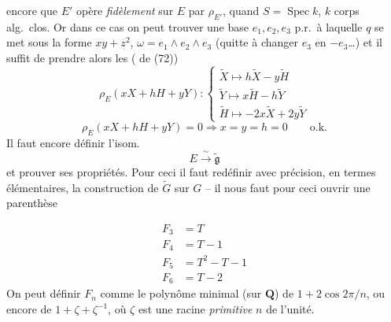 \documentclass[11pt,a4paper]{article}
\begin{document}
encore que $E'$ opère \emph{fidèlement} sur $E$ par $\rho_{E'}$, quand
$S = \operatorname{Spec} k$, $k$ corps alg.\ clos. Or dans ce cas on peut
trouver une base $e_1, e_2, e_3$ p.r.\ à laquelle $q$ se met sous la forme
$xy + z^2$, $\omega = e_1 \wedge e_2 \wedge e_3$ (quitte  à
changer $e_3$ en $-e_3$\ldots) et il suffit de prendre alors les (
de (72))
\[
  \rho_E(xX + hH + yY) :
  \begin{cases}
    \tilde{X} \mapsto h\tilde{X} - y\tilde{H} \\
    \tilde{Y} \mapsto x\tilde{H} - h\tilde{Y} \\
    \tilde{H} \mapsto -2x\tilde{X} + 2y\tilde{Y}
  \end{cases}
\]
\[
  \rho_E(xX + hH + yY) = 0 \Longrightarrow x = y = h = 0 \qquad \text{o.k.}
\]
Il faut encore définir l'isom.
\[
  E \xrightarrow{\ \sim\ } \widetilde{\mathfrak{g}}
\]
et prouver ses propriétés. Pour ceci il faut redéfinir avec précision, en
termes élémentaires, la construction de $\widetilde{G}$ sur $G$ -- il nous
faut pour ceci ouvrir une parenthèse

\[
  \begin{aligned}
    F_3 &= T \\
    F_4 &= T - 1 \\
    F_5 &= T^2 - T - 1 \\
    F_6 &= T - 2
  \end{aligned}
\]
On peut définir $F_n$ comme le polynôme minimal (sur $\mathbf{Q}$) de
$1 + 2\cos 2\pi/n$, \struck{\ill{}} ou encore de $1 + \zeta + \zeta^{-1}$, où
$\zeta$ est une racine \emph{primitive} $n$ de l'unité.
\end{document}
